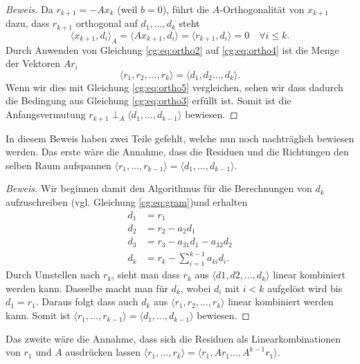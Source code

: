 \begin{proof}[Beweis]
Da $r_{k+1} = -Ax_k$ (weil $b=0$), führt die $A$-Orthogonalität von $x_{k+1}$ dazu, dass $r_{k+1}$ orthogonal auf $d_1, \dots, d_k$ steht
\begin{equation}\label{cg:eq:ortho5}
	\langle x_{k+1}, d_i \rangle_A = \langle Ax_{k+1}, d_i \rangle = \langle r_{k+1}, d_i \rangle = 0 \quad \forall i \le k.
\end{equation}
Durch Anwenden von Gleichung \eqref{cg:eq:ortho2} auf \eqref{cg:eq:ortho4} ist die Menge der Vektoren $Ar_i$
\begin{equation}
	\langle r_1, r_2, \dots , r_k \rangle = \langle d_1, d_2 \dots ,d_k \rangle.
\end{equation} 
Wenn wir dies mit Gleichung \eqref{cg:eq:ortho5} vergleichen, sehen wir dass dadurch die Bedingung aus Gleichung \eqref{cg:eq:ortho3} erfüllt ist.
Somit ist die Anfangsvermutung $r_{k+1} \perp_A \langle d_1, \dots ,d_{k-1} \rangle$ bewiesen.
\end{proof}

In diesem Beweis haben zwei Teile gefehlt, welche nun noch nachträglich bewiesen werden.
Das erste wäre die Annahme, dass die Residuen und die Richtungen den selben Raum aufspannen $\langle r_1, \dots ,r_{k-1} \rangle = \langle d_1, \dots ,d_{k-1} \rangle$.

\begin{proof}[Beweis]
Wir beginnen damit den Algorithmus für die Berechnungen von $d_k$ aufzuschreiben (vgl. Gleichung \eqref{cg:eq:gram})und erhalten
\begin{align}
	d_1 &= r_1 \nonumber\\
	d_2	&= r_2 - a_2 d_1\nonumber\\
	d_3	&= r_3 - a_{31} d_1 - a_{32} d_2\nonumber\\
	d_k &= r_k - \sum_{i=1}^{k-1} a_{ki} d_i.
\end{align}
Durch Umstellen nach $r_k$, sieht man dass $r_k$ aus $\langle d1, d2, \dots, d_k \rangle$ linear kombiniert werden kann.
Dasselbe macht man für $d_k$, wobei $d_i$ mit $i<k$ aufgelöst wird bis $d_1 = r_1$.
Daraus folgt dass auch $d_k$ aus $\langle r_1, r_2, \dots, r_k \rangle$ linear kombiniert werden kann.
Somit ist $\langle r_1, \dots ,r_{k-1} \rangle = \langle d_1, \dots ,d_{k-1} \rangle$ bewiesen.
\end{proof}

Das zweite wäre die Annahme, dass sich die Residuen als Linearkombinationen von $r_1$ und $A$ ausdrücken lassen $\langle r_1, \dots ,r_k \rangle = \langle r_1, Ar_1 \dots ,A^{k-1}r_1 \rangle$.

